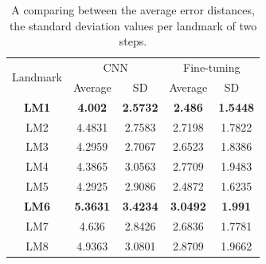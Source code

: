 \documentclass[10pt]{article}
\begin{document}
\begin{table}[htbp]
\centering
\begin{tabular}{ | c | c | c | c | c | }
\hline
	\multicolumn{1}{|c|}{\multirow{2}{*}{Landmark}} & \multicolumn{2}{c|}{CNN} &  \multicolumn{2}{c|}{Fine-tuning}  \\ \cline{2-5}
	 & Average & SD & Average & SD \  \\ \hline
	\textbf{LM1} & \textbf{4.002} & \textbf{2.5732} & \textbf{2.486} & \textbf{1.5448} \\ \hline
	LM2 & 4.4831 & 2.7583 & 2.7198 & 1.7822 \\ \hline
	LM3 & 4.2959 & 2.7067 & 2.6523 & 1.8386 \\ \hline
	LM4 & 4.3865 & 3.0563 & 2.7709 & 1.9483 \\ \hline
	LM5 & 4.2925 & 2.9086 & 2.4872 & 1.6235 \\ \hline
	\textbf{LM6} & \textbf{5.3631} & \textbf{3.4234} & \textbf{3.0492} & \textbf{1.991} \\ \hline
	LM7 & 4.636 & 2.8426 & 2.6836 & 1.7781 \\ \hline
	LM8 & 4.9363 & 3.0801 & 2.8709 & 1.9662 \\ \hline
\end{tabular}
\caption{A comparing between the average error distances, the standard deviation values per landmark of two steps.}
\label{tab2}
\end{table}
\end{document}
